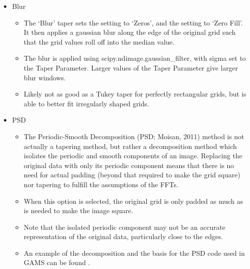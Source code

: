 \documentclass[letterpaper,10pt,english,openany,oneside]{sphinxmanual}
\begin{document}
\label{\detokenize{content/preprocessing/tapering:blur}}\begin{itemize}
\item {} 
Blur
\begin{itemize}
\item {} 
The ‘Blur’ taper sets the {\hyperref[\detokenize{content/preprocessing/padding:padding}]{}} setting to ‘Zeros’, and the {\hyperref[\detokenize{content/preprocessing/extrapolation:extrapolation}]{}} setting to ‘Zero Fill’. It then applies a gaussian blur along the edge of the original grid such that the grid values roll off into the median value.

\item {} 
The blur is applied using scipy.ndimage.gaussian\_filter, with sigma set to the Taper Parameter. Larger values of the Taper Parameter give larger blur windows.

\item {} 
Likely not as good as a Tukey taper for perfectly rectangular grids, but is able to better fit irregularly shaped grids.

\end{itemize}

\item {} 
PSD
\begin{itemize}
\item {} 
The Periodic-Smooth Decomposition (PSD; Moisan, 2011) method is not actually a tapering method, but rather a decomposition method which isolates the periodic and smooth components of an image. Replacing the original data with only its periodic component means that there is no need for actual padding (beyond that required to make the grid square) nor tapering to fulfill the assumptions of the FFTs.

\item {} 
When this option is selected, the original grid is only padded as much as is needed to make the image square.

\item {} 
Note that the isolated periodic component may not be an accurate representation of the original data, particularly close to the edges.

\item {} 
An example of the decomposition and the basis for the PSD code used in GAMS can be found .

\end{itemize}

\end{itemize}
\end{document}
